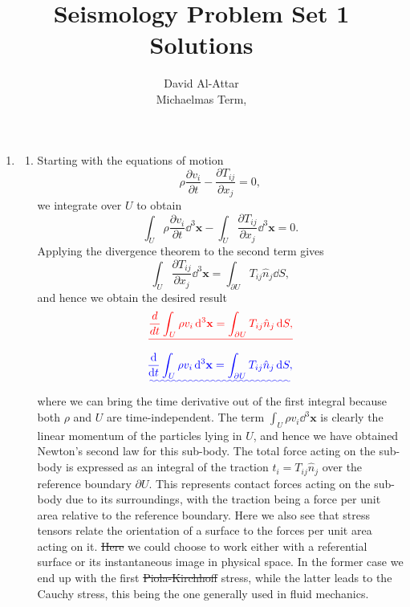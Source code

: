 \documentclass[a4paper,10pt]{paper}
\title{Seismology Problem Set 1 \DIFdelbegin \DIFdel{– }\DIFdelend \DIFaddbegin \DIFadd{-- }\DIFaddend Solutions}
\author{David Al-Attar \\ Michaelmas Term, \the\year}
\providecommand{\DIFadd}[1]{{\protect\color{blue}\uwave{#1}}} %
\providecommand{\DIFdel}[1]{{\protect\color{red}\sout{#1}}}                      %
\providecommand{\DIFaddbegin}{} %
\providecommand{\DIFaddend}{} %
\providecommand{\DIFdelbegin}{} %
\providecommand{\DIFdelend}{} %
\begin{document}
\maketitle

\begin{enumerate}

    \item 
    \begin{enumerate}
\item Starting with the equations of motion
\begin{equation*}
    \rho\frac{\partial v_{i}}{\partial t}-\frac{\partial T_{ij}}{\partial x_{j}}=0,
\end{equation*}
we integrate over $U$ to obtain
\begin{equation*}
    \int_{U}\rho\frac{\partial v_{i}}{\partial t}\dd^{3}\mathbf{x}-\int_{U}\frac{\partial T_{ij}}{\partial x_{j}}\dd^{3}\mathbf{x}=0.
\end{equation*}
Applying the divergence theorem to the second term gives
\begin{equation*}
    \int_{U}\frac{\partial T_{ij}}{\partial x_{j}}\dd^{3}\mathbf{x}=\int_{\partial U}T_{ij}\hat{n}_{j}\dd S,
\end{equation*}
and hence we obtain the desired result
\DIFdelbegin \begin{displaymath}
    \DIFdel{\frac{d}{dt}\int_{U}\rho v_{i}\dd^{3}\mathbf{x}=\int_{\partial U}T_{ij}\hat{n}_{j}\dd S,
}\end{displaymath}%
\DIFdelend \DIFaddbegin \begin{equation*}
    \DIFadd{\frac{\ddns}{\ddns t}\int_{U}\rho v_{i}\dd^{3}\mathbf{x}=\int_{\partial U}T_{ij}\hat{n}_{j}\dd S,
}\end{equation*}\DIFaddend 
where we can bring the time derivative out of the first integral because both $\rho$ and $U$ are time-independent. The term $\int_{U}\rho v_{i}\dd^{3}\mathbf{x}$ is clearly the linear momentum of the particles lying in $U$, and hence we have obtained Newton's second law for this sub-body. The total force acting on the sub-body is expressed as an integral of the traction $t_{i}=T_{ij}\hat{n}_{j}$ over the reference boundary $\partial U$. This represents contact forces acting on the sub-body due to its surroundings, with the traction being a force per unit area relative to the reference boundary. Here we also see that stress tensors relate the orientation of a surface to the forces per unit area acting on it. \DIFdelbegin \DIFdel{Here }\DIFdelend \DIFaddbegin \DIFadd{In doing so, }\DIFaddend we could choose to work either with a referential surface or its instantaneous image in physical space. In the former case we end up with the first \DIFdelbegin \DIFdel{Piola-Kirchhoff }\DIFdelend \DIFaddbegin \DIFadd{Piola--Kirchhoff }\DIFaddend stress, while the latter leads to the Cauchy stress, this being the one generally used in fluid mechanics.

\end{enumerate}
\end{enumerate}
\end{document}

